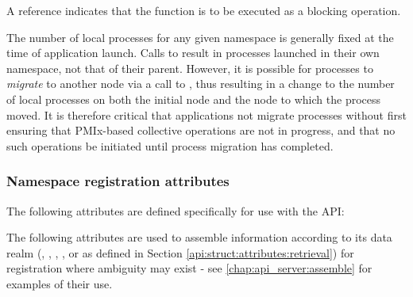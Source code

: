A   reference indicates that the function is to be executed as a blocking operation.
\advicermend

\adviceuserstart
The number of local processes for any given namespace is generally fixed at the time of application launch. Calls to  result in processes launched in their own namespace, not that of their parent. However, it is possible for processes to \textit{migrate} to another node via a call to , thus resulting in a change to the number of local processes on both the initial node and the node to which the process moved. It is therefore critical that applications not migrate processes without first ensuring that \ac{PMIx}-based collective operations are not in progress, and that no such operations be initiated until process migration has completed.
\adviceuserend


\subsubsection{Namespace registration attributes}
\label{api:struct:attributes:storage}

The following attributes are defined specifically for use with the  \ac{API}:
%

\vspace{\baselineskip}
The following attributes are used to assemble information according to its data realm (, , , , or  as defined in Section \ref{api:struct:attributes:retrieval}) for registration where ambiguity may exist - see \ref{chap:api_server:assemble} for examples of their use.

